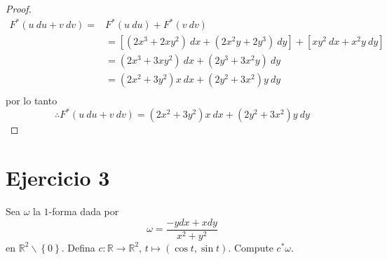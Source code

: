 \documentclass[12pt]{report}
\theoremstyle{largebreak}
\newcommand\cf[3]{\ensuremath{#1:#2\rightarrow#3}}
\begin{document}
\begin{proof}
\begin{equation*}
            \begin{split}
                F^*(u\:du+v\:dv)=&F^*(u\:du)+F^*(v\:dv)\\
                &=\left[(2x^3+2xy^2)\:dx+(2x^2y+2y^3)\:dy\right]+\left[xy^2\:dx+x^2y\: dy\right]\\
                &=(2x^3+3xy^2)\:dx+(2y^3+3x^2y)\:dy\\
                &=(2x^2+3y^2)x\:dx+(2y^2+3x^2)y\:dy\\
            \end{split}
        \end{equation*}
        por lo tanto
        \begin{equation*}
            \therefore F^*(u\:du+v\:dv)=(2x^2+3y^2)x\:dx+(2y^2+3x^2)y\:dy
        \end{equation*}
    \end{proof}

    \newpage

    \section{Ejercicio 3}

    \begin{excer}
        Sea $\omega$ la $1$-forma dada por
        \begin{equation*}
            \omega = \frac{-ydx+xdy}{x^2+y^2}
        \end{equation*}
        en $\mathbb{R}^2\backslash\left\{0\right\}$. Defina $\cf{c}{\mathbb{R}}{\mathbb{R}^2}$, $t\mapsto (\cos t,\sin t)$. Compute $c^*\omega$.
    \end{excer}
\end{document}
